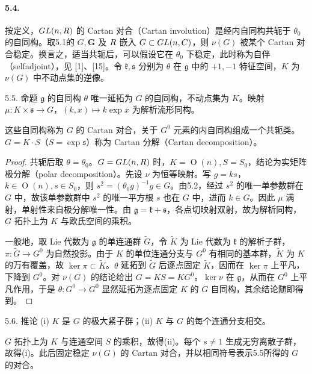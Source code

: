 \paragraph*{5.4.} 按定义，$GL(n,R)$ 的 Cartan 对合（Cartan involution）是经内自同构共轭于 $\theta_0$ 的自同构。取5.1的 $G,\mathbf G$ 及 $R$ 嵌入 $G\subset GL(n,C)$，则 $\nu(G)$ 被某个 Cartan 对合稳定。换言之，适当共轭后，可以假设它在 $\theta_0$ 下稳定，此时称为自伴（selfadjoint），见 [1]、[15]。令 $\mathfrak k,\mathfrak s$ 分别为 $\theta$ 在 $\mathfrak g$ 中的 $+1,-1$ 特征空间，$K$ 为 $\nu(G)$ 中不动点集的逆像。
\begin{originaltheorem}{5.5. 命题}
$\mathfrak g$ 的自同构 $\theta$ 唯一延拓为 $G$ 的自同构，不动点集为 $K$。映射 $\mu:K\times\mathfrak s\to G$，$(k,x)\mapsto k\exp x$ 为解析流形同构。
\end{originaltheorem}
这些自同构称为 $G$ 的 Cartan 对合，关于 $G^0$ 元素的内自同构组成一个共轭类。$G=K\cdot S$（$S=\exp\mathfrak s$）称为 Cartan 分解（Cartan decomposition）。
\begin{proof}
共轭后取 $\theta=\theta_0$。$G=GL(n,R)$ 时，$K=\operatorname O(n),S=S_0$，结论为实矩阵极分解（polar decomposition）。先设 $\nu$ 为恒等映射。写 $g=ks$，$k\in\operatorname O(n),s\in S_0$，则 $s^2=(\theta_0g)^{-1}g\in G$。由5.2，经过 $s^2$ 的唯一单参数群在 $G$ 中，故该单参数群中 $s^2$ 的唯一平方根 $s$ 也在 $G$ 中，进而 $k\in G$。因此 $\mu$ 满射，单射性来自极分解唯一性。由 $\mathfrak g=\mathfrak k+\mathfrak s$，各点切映射双射，故为解析同构，$G$ 拓扑上为 $K$ 与欧氏空间的乘积。

一般地，取 Lie 代数为 $\mathfrak g$ 的单连通群 $\widetilde G$，令 $\widetilde K$ 为 Lie 代数为 $\mathfrak k$ 的解析子群，$\pi:\widetilde G\to G^0$ 为自然投影。由于 $K$ 的单位连通分支与 $G^0$ 有相同的基本群，$\widetilde K$ 为 $K$ 的万有覆盖，故 $\ker\pi\subset\widetilde K$。$\theta$ 延拓到 $\widetilde G$ 后逐点固定 $\widetilde K$，因而在 $\ker\pi$ 上平凡，下降到 $G^0$。对 $\nu(G)$ 的结论给出 $G=KS=KG^0$。$\ker\nu$ 在 $\mathfrak g$，从而在 $G^0$ 上平凡作用，于是 $\theta:G^0\to G^0$ 显然延拓为逐点固定 $K$ 的 $G$ 自同构，其余结论随即得到。
\end{proof}
\begin{originaltheorem}{5.6. 推论}
(i) $K$ 是 $G$ 的极大紧子群；(ii) $K$ 与 $G$ 的每个连通分支相交。
\end{originaltheorem}
$G$ 拓扑上为 $K$ 与连通空间 $S$ 的乘积，故得(ii)。每个 $s\ne1$ 生成无穷离散子群，故得(i)。此后固定稳定 $\nu(G)$ 的 Cartan 对合，并以相同符号表示5.5所得的 $G$ 的对合。
